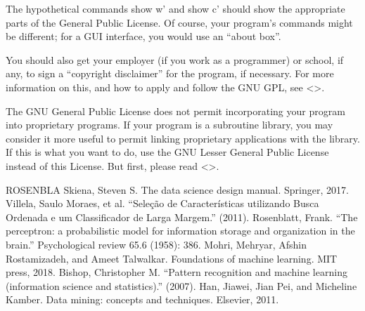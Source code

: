 \documentclass[letterpaper,10pt,english]{sphinxmanual}
\begin{document}
\sphinxAtStartPar
The hypothetical commands {\color{red}\bfseries{}\textasciigrave{}}show w’ and {\color{red}\bfseries{}\textasciigrave{}}show c’ should show the appropriate
parts of the General Public License.  Of course, your program’s commands
might be different; for a GUI interface, you would use an “about box”.

\sphinxAtStartPar
You should also get your employer (if you work as a programmer) or school,
if any, to sign a “copyright disclaimer” for the program, if necessary.
For more information on this, and how to apply and follow the GNU GPL, see
\textless{}\textgreater{}.

\sphinxAtStartPar
The GNU General Public License does not permit incorporating your program
into proprietary programs.  If your program is a subroutine library, you
may consider it more useful to permit linking proprietary applications with
the library.  If this is what you want to do, use the GNU Lesser General
Public License instead of this License.  But first, please read
\textless{}\textgreater{}.

\begin{sphinxthebibliography}{ROSENBLA}
\sphinxAtStartPar
Skiena, Steven S. The data science design manual. Springer, 2017.
\sphinxAtStartPar
Villela, Saulo Moraes, et al. “Seleção de Características utilizando Busca Ordenada e um Classificador de Larga Margem.” (2011).
\sphinxAtStartPar
Rosenblatt, Frank. “The perceptron: a probabilistic model for information storage and organization in the brain.” Psychological review 65.6 (1958): 386.
\sphinxAtStartPar
Mohri, Mehryar, Afshin Rostamizadeh, and Ameet Talwalkar. Foundations of machine learning. MIT press, 2018.
\sphinxAtStartPar
Bishop, Christopher M. “Pattern recognition and machine learning (information science and statistics).” (2007).
\sphinxAtStartPar
Han, Jiawei, Jian Pei, and Micheline Kamber. Data mining: concepts and techniques. Elsevier, 2011.
\end{sphinxthebibliography}



\renewcommand{\indexname}{Index}
\printindex
\end{document}
